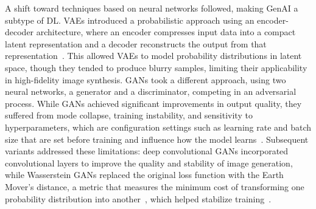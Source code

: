 \documentclass[
english,                 %
bibtex,                  %
includeExtraAbstracts, %
]{kththesis}
\numberwithin{listing}{chapter}
\begin{document}
A shift toward techniques based on neural networks followed, making \gls{GenAI} a subtype of \gls{DL}. \Glspl{VAE} introduced a probabilistic approach using an encoder-decoder architecture, where an encoder compresses input data into a compact latent representation and a decoder reconstructs the output from that representation~\cite{kingma_auto-encoding_2013}. This allowed \glspl{VAE} to model probability distributions in latent space, though they tended to produce blurry samples, limiting their applicability in high-fidelity image synthesis. \Glspl{GAN} took a different approach, using two neural networks, a generator and a discriminator, competing in an adversarial process. While \glspl{GAN} achieved significant improvements in output quality, they suffered from mode collapse, training instability, and sensitivity to hyperparameters, which are configuration settings such as learning rate and batch size that are set before training and influence how the model learns~\cite{jim_dowling_building_2025}. Subsequent variants addressed these limitations: deep convolutional \glspl{GAN} incorporated convolutional layers to improve the quality and stability of image generation, while Wasserstein \glspl{GAN} replaced the original loss function with the Earth Mover's distance, a metric that measures the minimum cost of transforming one probability distribution into another~\cite{rubner_earth_2000}, which helped stabilize training~\cite{trigka_evolution_2025}.
\end{document}
